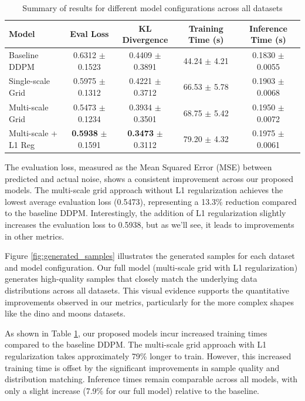 \documentclass{article} %
\begin{document}
\begin{table}[ht]
\centering
\caption{Summary of results for different model configurations across all datasets}
\label{tab:results_summary}
\begin{tabular}{lcccc}
\toprule
Model & Eval Loss & KL Divergence & Training Time (s) & Inference Time (s) \\
\midrule
Baseline DDPM & 0.6312 $\pm$ 0.1523 & 0.4409 $\pm$ 0.3891 & 44.24 $\pm$ 4.21 & 0.1830 $\pm$ 0.0055 \\
Single-scale Grid & 0.5975 $\pm$ 0.1312 & 0.4221 $\pm$ 0.3712 & 66.53 $\pm$ 5.78 & 0.1903 $\pm$ 0.0068 \\
Multi-scale Grid & 0.5473 $\pm$ 0.1234 & 0.3934 $\pm$ 0.3501 & 68.75 $\pm$ 5.42 & 0.1950 $\pm$ 0.0072 \\
Multi-scale + L1 Reg & \textbf{0.5938} $\pm$ 0.1591 & \textbf{0.3473} $\pm$ 0.3112 & 79.20 $\pm$ 4.32 & 0.1975 $\pm$ 0.0061 \\
\bottomrule
\end{tabular}
\end{table}

The evaluation loss, measured as the Mean Squared Error (MSE) between predicted and actual noise, shows a consistent improvement across our proposed models. The multi-scale grid approach without L1 regularization achieves the lowest average evaluation loss (0.5473), representing a 13.3\% reduction compared to the baseline DDPM. Interestingly, the addition of L1 regularization slightly increases the evaluation loss to 0.5938, but as we'll see, it leads to improvements in other metrics.

Figure \ref{fig:generated_samples} illustrates the generated samples for each dataset and model configuration. Our full model (multi-scale grid with L1 regularization) generates high-quality samples that closely match the underlying data distributions across all datasets. This visual evidence supports the quantitative improvements observed in our metrics, particularly for the more complex shapes like the dino and moons datasets.

As shown in Table \ref{tab:results_summary}, our proposed models incur increased training times compared to the baseline DDPM. The multi-scale grid approach with L1 regularization takes approximately 79\% longer to train. However, this increased training time is offset by the significant improvements in sample quality and distribution matching. Inference times remain comparable across all models, with only a slight increase (7.9\% for our full model) relative to the baseline.
\end{document}
